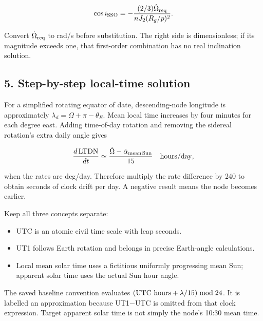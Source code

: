 \documentclass[10pt,a4paper]{article}
\numberwithin{equation}{section}
\begin{document}
\begin{equation}\cos i_{\rm SSO}=
-\frac{(2/3)\dot\Omega_{\rm req}}
{nJ_2(R_g/p)^2}.\label{eq:sso-inclination}\end{equation}

\begin{sloppypar}Convert \(\dot\Omega_{\rm req}\) to rad/s before substitution. The right side is dimensionless; if its magnitude exceeds one, that first-order combination has no real inclination solution.\end{sloppypar}


\subsection*{5. Step-by-step local-time solution}
\begin{sloppypar}For a simplified rotating equator of date, descending-node longitude is approximately \(\lambda_d=\Omega+\pi-\theta_E\). Mean local time increases by four minutes for each degree east. Adding time-of-day rotation and removing the sidereal rotation's extra daily angle gives\end{sloppypar}


\begin{equation}\frac{d\,{\rm LTDN}}{dt}\simeq
\frac{\dot\Omega-\dot\alpha_{\rm mean\,Sun}}{15}
\quad {\rm hours/day},\label{eq:ch4-3}\end{equation}

\begin{sloppypar}when the rates are deg/day. Therefore multiply the rate difference by 240 to obtain seconds of clock drift per day. A negative result means the node becomes earlier.\end{sloppypar}


\begin{sloppypar}Keep all three concepts separate:\end{sloppypar}


\begin{itemize}
\item UTC is an atomic civil time scale with leap seconds.
\item UT1 follows Earth rotation and belongs in precise Earth-angle calculations.
\item Local mean solar time uses a fictitious uniformly progressing mean Sun; apparent solar time uses the actual Sun hour angle.
\end{itemize}

\begin{sloppypar}The saved baseline convention evaluates \(({\rm UTC\ hours}+\lambda/15)\bmod24\). It is labelled an approximation because UT1\ensuremath{-}UTC is omitted from that clock expression. Target apparent solar time is not simply the node's 10:30 mean time.\end{sloppypar}
\end{document}
